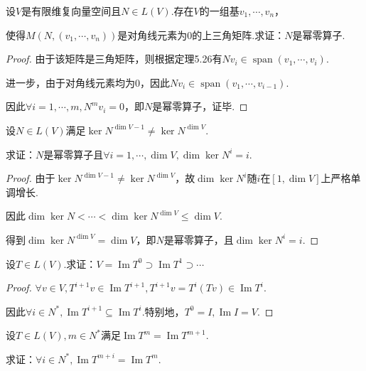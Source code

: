\newpage

\begin{problem}[12]\label{8.A.12}
    设\(V\)是有限维复向量空间且\(N \in L(V)\).存在\(V\)的一组基\(v_1,\cdots,v_n\)，

    使得\(M(N,(v_1,\cdots,v_n))\)是对角线元素为\(0\)的上三角矩阵.求证：\(N\)是幂零算子.
\end{problem}

\begin{proof}
    由于该矩阵是三角矩阵，则根据定理5.26有\(Nv_i \in \operatorname{span} (v_1,\cdots,v_i)\).

    进一步，由于对角线元素均为\(0\)，因此\(Nv_i \in \operatorname{span} (v_1,\cdots,v_{i-1})\).
    
    因此\(\forall i=1,\cdots,m,N^m v_i=0\)，即\(N\)是幂零算子，证毕.
\end{proof}

\begin{problem}[15]\label{8.A.15}
    设\(N \in L(V)\)满足\(\ker N^{\dim V-1} \ne \ker N^{\dim V}\).

    求证：\(N\)是幂零算子且\(\forall i=1,\cdots,\dim V,\dim \ker N^i=i\).
\end{problem}

\begin{proof}
    由于\(\ker N^{\dim V-1} \ne \ker N^{\dim V}\)，故\(\dim \ker N^i\)随\(i\)在\([1,\dim V]\)上严格单调增长.

    因此\(\dim \ker N<\cdots<\dim \ker N^{\dim V} \leq \dim V\).
    
    得到\(\dim \ker N^{\dim V}=\dim V\)，即\(N\)是幂零算子，且\(\dim \ker N^i=i\).    
\end{proof}

\begin{problem}[16]\label{8.A.16}
    设\(T \in L(V)\).求证：\(V=\operatorname{Im} T^0 \supset \operatorname{Im} T^1 \supset \cdots\)
\end{problem}

\begin{proof}
    \(\forall v \in V,T^{i+1}v \in \operatorname{Im} T^{i+1},T^{i+1}v=T^i(Tv) \in \operatorname{Im} T^i\).

    因此\(\forall i \in N^*,\operatorname{Im} T^{i+1} \subseteq \operatorname{Im} T^i\).特别地，\(T^0=I,\operatorname{Im} I=V\).
\end{proof}

\begin{problem}[17]\label{8.A.17}
    设\(T \in L(V),m \in N^*\)满足\(\operatorname{Im} T^m=\operatorname{Im} T^{m+1}\).
    
    求证：\(\forall i \in N^*,\operatorname{Im} T^{m+i}=\operatorname{Im} T^m\).
\end{problem}

